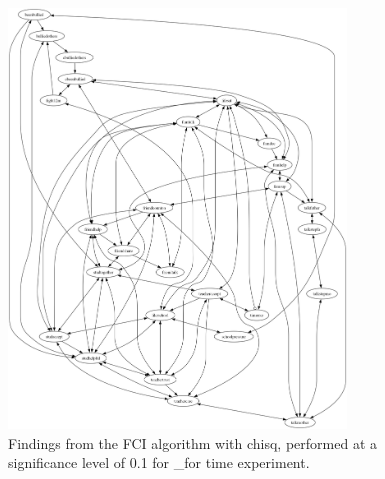 \begin{figure}[htbp]
    \centering
    \includegraphics[width=0.8\textwidth]{Report/final_report/pictures/FCI_chisq_0.1__for time experiment.png}
    \caption{Findings from the FCI algorithm with chisq, performed at a significance level of 0.1 for _for time experiment.}
    \label{fig:fci_chisq_0.1_for time experiment}
\end{figure}
